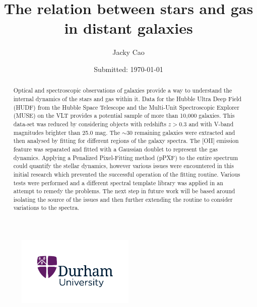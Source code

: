 \documentclass[12pt, twocolumn, nofootinbib]{revtex4-1}    %
\begin{document}
                     

\begin{titlepage}
\title{The relation between stars and gas in distant galaxies} 
\date{Submitted: \today{}}
\author{Jacky Cao}

\begin{abstract}              
Optical and spectroscopic observations of galaxies provide a way to understand the internal dynamics of the stars and gas within it. Data for the Hubble Ultra Deep Field (HUDF) from the Hubble Space Telescope and the Multi-Unit Spectroscopic Explorer (MUSE) on the VLT provides a potential sample of more than 10,000 galaxies. This data-set was reduced by considering objects with redshifts $z>0.3$ and with V-band magnitudes brighter than 25.0 mag. The $\sim30$ remaining galaxies were extracted and then analysed by fitting for different regions of the galaxy spectra. The [OII] emission feature was separated and fitted with a Gaussian doublet to represent the gas dynamics. Applying a Penalized Pixel-Fitting method (pPXF) to the entire spectrum could quantify the stellar dynamics, however various issues were encountered in this initial research which prevented the successful operation of the fitting routine. Various tests were performed and a different spectral template library was applied in an attempt to remedy the problems. The next step in future work will be based around isolating the source of the issues and then further extending the routine to consider variations to the spectra.
\end{abstract}

\begin{figure}[b]
\centering
\includegraphics[width=0.5\textwidth]{other/durham_university}
\end{figure}

\maketitle
\end{titlepage}
\end{document}
